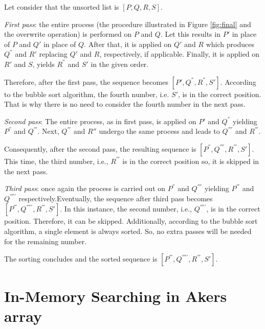 \documentclass[conference]{IEEEtran}
\begin{document}
Let consider that the unsorted list is $[P, Q, R, S]$.

\medskip

\textit{First pass}: the entire process (the procedure illustrated in Figure \ref{fig:final} and the overwrite operation) is performed on $P$ and $Q$. Let this results in $P'$ in place of $P$ and $Q'$ in place of $Q$. After that, it is applied on $Q'$ and $R$ which produces $Q^{''}$ and $R'$ replacing $Q'$ and $R$, respectively, if applicable. Finally, it is applied on $R'$ and $S$, yields $R^{''}$ and $S'$ in the given order.

Therefore, after the first pass, the sequence becomes $[P', Q^{''}, R^{''}, S']$. According to the bubble sort algorithm, the fourth number, i.e. $S'$, is in the correct position. That is why there is no need to consider the fourth number in the next pass.

\medskip

\textit{Second pass}: The entire process, as in first pass, is applied on $P'$ and $Q^{''}$ yielding $P^{''}$ and $Q^{'''}$. Next, $Q^{'''}$ and $R{''}$ undergo the same process and leads to $Q^{''''}$ and $R^{'''}$.

Consequently, after the second pass, the resulting sequence is $[P^{''}, Q^{''''}, R^{'''}, S']$. This time, the third number, i.e., $R^{'''}$ is in the correct position so, it is skipped in the next pass.

\medskip

\textit{Third pass}: once again the process is carried out on $P^{''}$ and $Q^{''''}$ yielding $P^{'''}$ and $Q^{'''''}$ respectively.Eventually, the sequence after third pass becomes $[P^{'''}, Q^{'''''}, R^{'''}, S']$. In this instance, the second number, i.e., $Q^{'''''}$, is in the correct position. Therefore, it can be skipped. Additionally, according to the bubble sort algorithm, a single element is always sorted. So, no extra passes will be needed for the remaining number.

\medskip

The sorting concludes and the sorted sequence is $[P^{'''}, Q^{'''''}, R^{'''}, S']$.

\medskip


\section{In-Memory Searching in Akers array}{\label{sec:search}}

\end{document}
